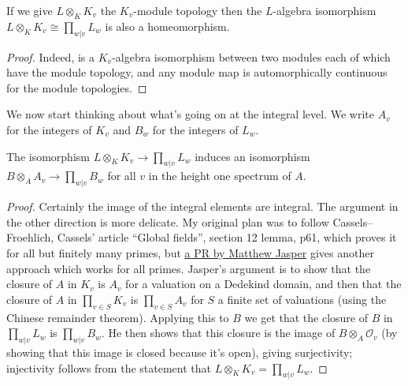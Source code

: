 \begin{theorem}
  \label{IsDedekindDomain.HeightOneSpectrum.adicCompletionComapContinuousAlgEquiv}
  If we give $L\otimes_KK_v$ the $K_v$-module topology then the $L$-algebra isomorphism
  $L\otimes_K K_v\cong\prod_{w|v}L_w$ is also a homeomorphism.
\end{theorem}
\begin{proof} Indeed, is a $K_v$-algebra isomorphism between two modules each of which
  have the module topology, and any module map is automorphically continuous for the
  module topologies.
\end{proof}

We now start thinking about what's going on at the integral level. We write $A_v$
for the integers of $K_v$ and $B_w$ for the integers of $L_w$.

\begin{theorem}
  \label{IsDedekindDomain.HeightOneSpectrum.adicCompletionComapAlgEquiv_integral}
  \leanok
  The isomorphism $L\otimes_KK_v\to\prod_{w|v}L_w$ induces an isomorphism
  $B\otimes_AA_v\to \prod_{w|v}B_w$
  for all $v$ in the height one spectrum of $A$.
\end{theorem}
\begin{proof}
  \leanok
  Certainly the image of the integral elements are integral. The argument in the other
  direction is more delicate. My original plan was to follow Cassels--Froehlich,
  Cassels' article ``Global fields'', section 12 lemma, p61, which proves it for
  all but finitely many primes, but \href{https://github.com/ImperialCollegeLondon/FLT/pull/400}
  {a PR by Matthew Jasper} gives another approach which works for all primes.
  Jasper's argument is to show that the closure of $A$ in $K_v$ is $A_v$
  for a valuation on a Dedekind domain, and then that the closure of $A$ in $\prod_{v\in S}K_v$
  is $\prod_{v\in S}A_v$ for $S$ a finite set of valuations (using the Chinese
  remainder theorem). Applying this to $B$ we get that the closure of $B$ in $\prod_{w|v}L_w$
  is $\prod_{w|v}B_w$. He then shows that this closure is the image of
  $B\otimes_A\mathcal{O}_v$ (by showing that this image is closed because it's open),
  giving surjectivity; injectivity follows from the statement
  that $L\otimes_KK_v=\prod_{w|v}L_w$.
\end{proof}

